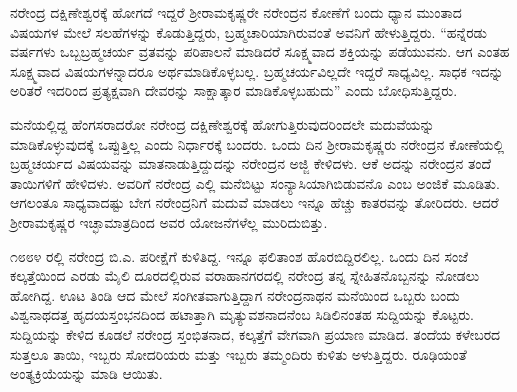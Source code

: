\vskip 2pt

ನರೇಂದ್ರ ದಕ್ಷಿಣೇಶ್ವರಕ್ಕೆ ಹೋಗದೆ ಇದ್ದರೆ ಶ‍್ರೀರಾಮಕೃಷ್ಣರೇ ನರೇಂದ್ರನ ಕೋಣೆಗೆ ಬಂದು ಧ್ಯಾನ ಮುಂತಾದ ವಿಷಯಗಳ ಮೇಲೆ ಸಲಹೆಗಳನ್ನು ಕೊಡುತ್ತಿದ್ದರು, ಬ್ರಹ್ಮಚಾರಿಯಾಗಿರುವಂತೆ ಅವನಿಗೆ ಹೇಳುತ್ತಿದ್ದರು. “ಹನ್ನೆರಡು ವರ್ಷಗಳು ಒಬ್ಬ\break ಬ್ರಹ್ಮಚರ್ಯ ವ್ರತವನ್ನು ಪರಿಪಾಲನೆ ಮಾಡಿದರೆ ಸೂಕ್ಷ್ಮವಾದ ಶಕ್ತಿಯನ್ನು ಪಡೆಯುವನು. ಆಗ ಎಂತಹ ಸೂಕ್ಷ್ಮವಾದ ವಿಷಯಗಳನ್ನಾದರೂ ಅರ್ಥಮಾಡಿಕೊಳ್ಳಬಲ್ಲ. ಬ್ರಹ್ಮಚರ್ಯವಿಲ್ಲದೇ ಇದ್ದರೆ ಸಾಧ್ಯವಿಲ್ಲ. ಸಾಧಕ ಇದನ್ನು ಅರಿತರೆ ಇದರಿಂದ ಪ್ರತ್ಯಕ್ಷವಾಗಿ ದೇವರನ್ನು ಸಾಕ್ಷಾತ್ಕಾರ ಮಾಡಿಕೊಳ್ಳಬಹುದು” ಎಂದು ಬೋಧಿಸುತ್ತಿದ್ದರು.

\vskip 2pt

ಮನೆಯಲ್ಲಿದ್ದ ಹೆಂಗಸರಾದರೋ ನರೇಂದ್ರ ದಕ್ಷಿಣೇಶ್ವರಕ್ಕೆ ಹೋಗುತ್ತಿರುವುದ\break ರಿಂದಲೇ ಮದುವೆಯನ್ನು ಮಾಡಿಕೊಳ್ಳುವುದಕ್ಕೆ ಒಪ್ಪುತ್ತಿಲ್ಲ ಎಂದು ನಿರ್ಧಾರಕ್ಕೆ ಬಂದರು. ಒಂದು ದಿನ ಶ‍್ರೀರಾಮಕೃಷ್ಣರು ನರೇಂದ್ರನ ಕೋಣೆಯಲ್ಲಿ ಬ್ರಹ್ಮಚರ್ಯದ ವಿಷಯವನ್ನು ಮಾತನಾಡುತ್ತಿದ್ದುದನ್ನು ನರೇಂದ್ರನ ಅಜ್ಜಿ ಕೇಳಿದಳು. ಆಕೆ ಅದನ್ನು ನರೇಂದ್ರನ ತಂದೆ ತಾಯಿಗಳಿಗೆ ಹೇಳಿದಳು. ಅವರಿಗೆ ನರೇಂದ್ರ ಎಲ್ಲಿ ಮನೆಬಿಟ್ಟು ಸಂನ್ಯಾಸಿಯಾಗಿಬಿಡುವನೊ ಎಂಬ ಅಂಜಿಕೆ ಮೂಡಿತು. ಆಗಲಂತೂ ಸಾಧ್ಯವಾದಷ್ಟು ಬೇಗ ನರೇಂದ್ರನಿಗೆ ಮದುವೆ ಮಾಡಲು ಇನ್ನೂ ಹೆಚ್ಚು ಕಾತರವನ್ನು ತೋರಿದರು. ಆದರೆ ಶ‍್ರೀರಾಮಕೃಷ್ಣರ ಇಚ್ಛಾಮಾತ್ರದಿಂದ ಅವರ ಯೋಜನೆಗಳೆಲ್ಲ ಮುರಿದುಬಿತ್ತು.

೧೮೮೪ ರಲ್ಲಿ ನರೇಂದ್ರ ಬಿ.ಎ. ಪರೀಕ್ಷೆಗೆ ಕುಳಿತಿದ್ದ. ಇನ್ನೂ ಫಲಿತಾಂಶ ಹೊರಬಿದ್ದಿರಲಿಲ್ಲ. ಒಂದು ದಿನ ಸಂಜೆ ಕಲ್ಕತ್ತೆಯಿಂದ ಎರಡು ಮೈಲಿ ದೂರದಲ್ಲಿರುವ ವರಾಹಾನಗರದಲ್ಲಿ ನರೇಂದ್ರ ತನ್ನ ಸ್ನೇಹಿತನೊಬ್ಬನನ್ನು ನೋಡಲು ಹೋಗಿದ್ದ. ಊಟ ತಿಂಡಿ ಆದ ಮೇಲೆ ಸಂಗೀತವಾಗುತ್ತಿದ್ದಾಗ ನರೇಂದ್ರನಾಥನ ಮನೆಯಿಂದ ಒಬ್ಬರು ಬಂದು ವಿಶ್ವನಾಥದತ್ತ ಹೃದಯಸ್ತಂಭನದಿಂದ ಹಟಾತ್ತಾಗಿ ಮೃತ್ಯುವಶನಾದನೆಂಬ ಸಿಡಿಲಿನಂತಹ ಸುದ್ದಿಯನ್ನು ಕೊಟ್ಟರು. ಸುದ್ದಿಯನ್ನು ಕೇಳಿದ ಕೂಡಲೆ ನರೇಂದ್ರ ಸ್ತಂಭಿತನಾದ, ಕಲ್ಕತ್ತೆಗೆ ವೇಗವಾಗಿ ಪ್ರಯಾಣ ಮಾಡಿದ. ತಂದೆಯ ಕಳೇಬರದ ಸುತ್ತಲೂ ತಾಯಿ, ಇಬ್ಬರು ಸೋದರಿಯರು ಮತ್ತು ಇಬ್ಬರು ತಮ್ಮಂದಿರು ಕುಳಿತು ಅಳುತ್ತಿದ್ದರು. ರೂಢಿಯಂತೆ ಅಂತ್ಯಕ್ರಿಯೆಯನ್ನು ಮಾಡಿ ಆಯಿತು.

